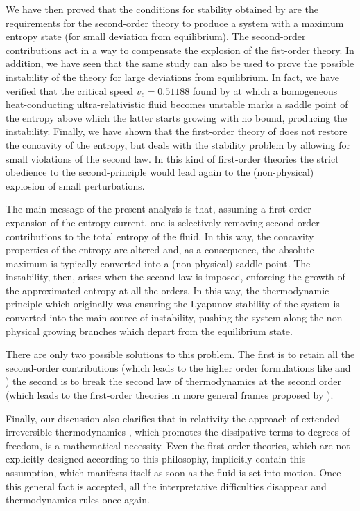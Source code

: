 \documentclass[a4paper, amsfonts, amssymb, amsmath, reprint, showkeys, nofootinbib, twoside]{revtex4-1}
\begin{document}
We have then proved that the conditions for stability obtained by \citet{Hishcock1983} are the requirements for the second-order theory to produce a system with a maximum entropy state (for small deviation from equilibrium). The second-order contributions act in a way to compensate the explosion of the fist-order theory. In addition, we have seen that the same study can also be used to prove the possible instability of the \citet{Israel_Stewart_1979} theory for large deviations from equilibrium. In fact, we have verified that the critical speed $v_c= 0.51188$ found by \citet{Hishcock1988} at which a homogeneous heat-conducting ultra-relativistic fluid becomes unstable marks a saddle point of the entropy above which the latter starts growing with no bound, producing the instability. Finally, we have shown that the first-order theory of \citet{Bemfica_2019_nonlinear} does not restore the concavity of the entropy, but deals with the stability problem by allowing for small violations of the second law. In this kind of first-order theories the strict obedience to the second-principle would lead again to the (non-physical) explosion of small perturbations.

The main message of the present analysis is that, assuming a first-order expansion of the entropy current, one is selectively removing second-order contributions to the total entropy of the fluid. In this way, the concavity properties of the entropy are altered and, as a consequence, the absolute maximum is typically converted into a (non-physical) saddle point. The instability, then, arises when the second law is imposed, enforcing the growth of the approximated entropy at all the orders. In this way, the thermodynamic principle which originally was ensuring the Lyapunov stability of the system is converted into the main source of instability, pushing the system along the non-physical growing branches which depart from the equilibrium state. 

There are only two possible solutions to this problem. The first is to retain all the second-order contributions (which leads to the higher order formulations like \citet{Israel_Stewart_1979} and \citet{carter1991}) the second is to break the second law of thermodynamics at the second order (which leads to the first-order theories in more general frames proposed by \citet{Bemfica_2019_nonlinear}).   

Finally, our discussion also clarifies that in relativity the approach of extended irreversible thermodynamics \citep{Stewart_1977,Jou_Extended}, which promotes the dissipative terms to degrees of freedom, is a mathematical necessity. Even the first-order theories, which are not explicitly designed according to this philosophy, implicitly contain this assumption, which manifests itself as soon as the fluid is set into motion. Once this general fact is accepted, all the interpretative difficulties disappear and thermodynamics rules once again. 
\end{document}
